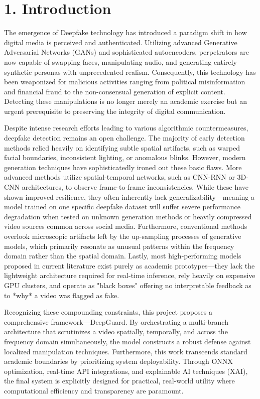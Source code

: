 \documentclass[12pt,a4paper]{article}
\begin{document}
\section{1. Introduction}
The emergence of Deepfake technology has introduced a paradigm shift in how digital media is perceived and authenticated. Utilizing advanced Generative Adversarial Networks (GANs) and sophisticated autoencoders, perpetrators are now capable of swapping faces, manipulating audio, and generating entirely synthetic personas with unprecedented realism. Consequently, this technology has been weaponized for malicious activities ranging from political misinformation and financial fraud to the non-consensual generation of explicit content. Detecting these manipulations is no longer merely an academic exercise but an urgent prerequisite to preserving the integrity of digital communication.

Despite intense research efforts leading to various algorithmic countermeasures, deepfake detection remains an open challenge. The majority of early detection methods relied heavily on identifying subtle spatial artifacts, such as warped facial boundaries, inconsistent lighting, or anomalous blinks. However, modern generation techniques have sophisticatedly ironed out these basic flaws. More advanced methods utilize spatial-temporal networks, such as CNN-RNN or 3D-CNN architectures, to observe frame-to-frame inconsistencies. While these have shown improved resilience, they often inherently lack generalizability—meaning a model trained on one specific deepfake dataset will suffer severe performance degradation when tested on unknown generation methods or heavily compressed video sources common across social media. Furthermore, conventional methods overlook microscopic artifacts left by the up-sampling processes of generative models, which primarily resonate as unusual patterns within the frequency domain rather than the spatial domain. Lastly, most high-performing models proposed in current literature exist purely as academic prototypes—they lack the lightweight architecture required for real-time inference, rely heavily on expensive GPU clusters, and operate as "black boxes" offering no interpretable feedback as to *why* a video was flagged as fake.

Recognizing these compounding constraints, this project proposes a comprehensive framework—DeepGuard. By orchestrating a multi-branch architecture that scrutinizes a video spatially, temporally, and across the frequency domain simultaneously, the model constructs a robust defense against localized manipulation techniques. Furthermore, this work transcends standard academic boundaries by prioritizing system deployability. Through ONNX optimization, real-time API integrations, and explainable AI techniques (XAI), the final system is explicitly designed for practical, real-world utility where computational efficiency and transparency are paramount.
\end{document}
